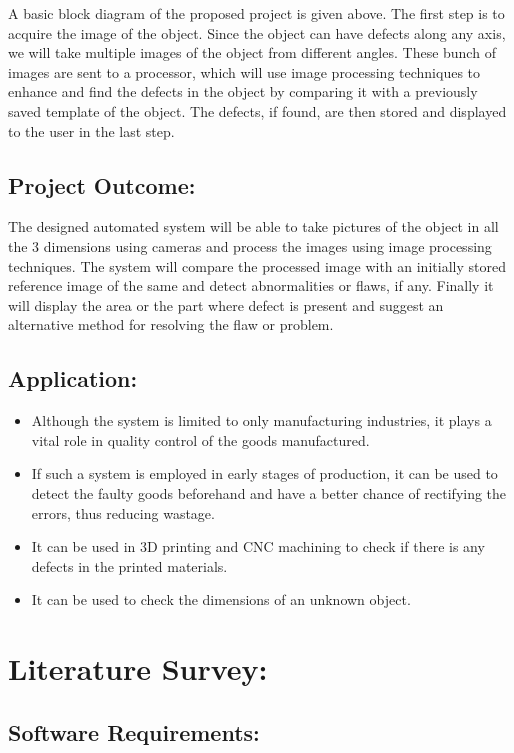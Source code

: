 \documentclass[14pt]{extarticle}
\begin{document}
{\quad}A basic block diagram of the proposed project is given above. The first step is to acquire the image of the object. Since the object can have defects along any axis, we will take multiple images of the object from different angles. These bunch of images are sent to a processor, which will use image processing techniques to enhance and find the defects in the object by comparing it with a previously saved template of the object. The defects, if found, are then stored and displayed to the user in the last step. 

\subsection{Project Outcome:}
{\quad}The designed automated system will be able to take pictures of the object in all the 3 dimensions using cameras and process the images using image processing techniques. The system will compare the processed image with an initially stored reference image of the same and detect abnormalities or flaws, if any. Finally it will display the area or the part where defect is present and suggest an alternative method for resolving the flaw or problem. 

\subsection{Application:}
\begin{itemize}
\item{
Although the system is limited to only manufacturing industries, it plays a vital role in quality control of the goods manufactured.
}
\item{
If such a system is employed in early stages of production, it can be used to detect the faulty goods beforehand and have a better chance of rectifying the errors, thus reducing wastage.
}
\item{
It can be used in 3D printing and CNC machining to check if there is any defects in the printed materials.
}
\item{
It can be used to check the dimensions of an unknown object.
}

\end{itemize}

\section{Literature Survey:}
\subsection{Software Requirements:}
\end{document}
